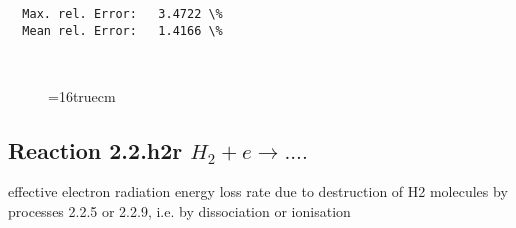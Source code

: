 \documentclass[12pt,dvipdfmx]{article}
\begin{document}
\begin{small}
\begin{verbatim}
  Max. rel. Error:   3.4722 \%
  Mean rel. Error:   1.4166 \%



\end{verbatim}\end{small}
\begin{figure} \label{2.2.h2c}
\epsfxsize=16truecm
\end{figure}
\newpage

\subsection{
  Reaction 2.2.h2r $H_2 + e \rightarrow  ....$
}

   effective electron radiation energy loss rate due to destruction of H2 molecules by
   processes 2.2.5 or 2.2.9, i.e. by dissociation or ionisation
\end{document}
